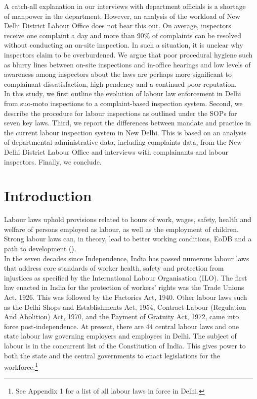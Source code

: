 \documentclass[a4paper, 12pt, twoside]{article}
\begin{document}
A catch-all explanation in our interviews with department officials is a shortage of manpower in the department. However, an analysis of the workload of New Delhi District Labour Office does not bear this out. On average, inspectors receive one complaint a day and more than 90\% of complaints can be resolved without conducting an on-site inspection. In such a situation, it is unclear why inspectors claim to be overburdened. We argue that poor procedural hygiene such as blurry lines between on-site inspections and in-office hearings and low levels of awareness among inspectors about the laws are perhaps more significant to complainant dissatisfaction, high pendency and a continued poor reputation. \\

In this study, we first outline the evolution of labour law enforcement in Delhi from suo-moto inspections to a complaint-based inspection system. Second, we describe the procedure for labour inspections as outlined under the SOPs for seven key laws. Third, we report the differences between mandate and practice in the current labour inspection system in New Delhi. This is based on an analysis of departmental administrative data, including complaints data, from the New Delhi District Labour Office and interviews with complainants and labour inspectors. Finally, we conclude. \\


\newpage
\section{Introduction}

Labour laws uphold provisions related to hours of work, wages, safety, health and welfare of persons employed as labour, as well as the employment of children. Strong labour laws can, in theory, lead to better working conditions, EoDB and a path to development (\cite{deshingkarpaper}).\\

In the seven decades since Independence, India has passed numerous labour laws that address core standards of worker health, safety and protection from injustices as specified by the International Labour Organisation (ILO). The first law enacted in India for the protection of workers’ rights was the Trade Unions Act, 1926. This was followed by the Factories Act, 1940. Other labour laws such as the Delhi Shops and Establishments Act, 1954, Contract Labour (Regulation And Abolition) Act, 1970, and the Payment of Gratuity Act, 1972, came into force post-independence. At present, there are 44 central labour laws and one state labour law governing employers and employees in Delhi. The subject of labour is in the concurrent list of the Constitution of India. This gives power to both the state and the central governments to enact legislations for the workforce.\footnote{See Appendix 1 for a list of all labour laws in force in Delhi.}\\
\end{document}
